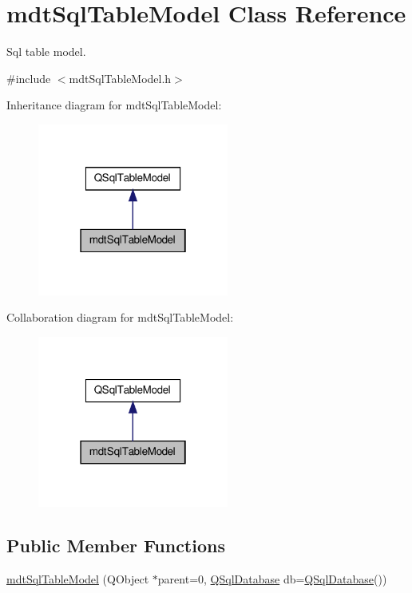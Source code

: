 \hypertarget{classmdt_sql_table_model}{\section{mdt\-Sql\-Table\-Model Class Reference}
\label{classmdt_sql_table_model}
}


Sql table model.  




{\ttfamily \#include $<$mdt\-Sql\-Table\-Model.\-h$>$}



Inheritance diagram for mdt\-Sql\-Table\-Model\-:\nopagebreak
\begin{figure}[H]
\begin{center}
\leavevmode
\includegraphics[width=178pt]{classmdt_sql_table_model__inherit__graph}
\end{center}
\end{figure}


Collaboration diagram for mdt\-Sql\-Table\-Model\-:\nopagebreak
\begin{figure}[H]
\begin{center}
\leavevmode
\includegraphics[width=178pt]{classmdt_sql_table_model__coll__graph}
\end{center}
\end{figure}
\subsection*{Public Member Functions}
\begin{DoxyCompactItemize}
\item 
\hyperlink{classmdt_sql_table_model_ad423c1b0c74ecbbb575637b028c2574b}{mdt\-Sql\-Table\-Model} (Q\-Object $\ast$parent=0, \hyperlink{class_q_sql_database}{Q\-Sql\-Database} db=\hyperlink{class_q_sql_database}{Q\-Sql\-Database}())
\end{DoxyCompactItemize}


